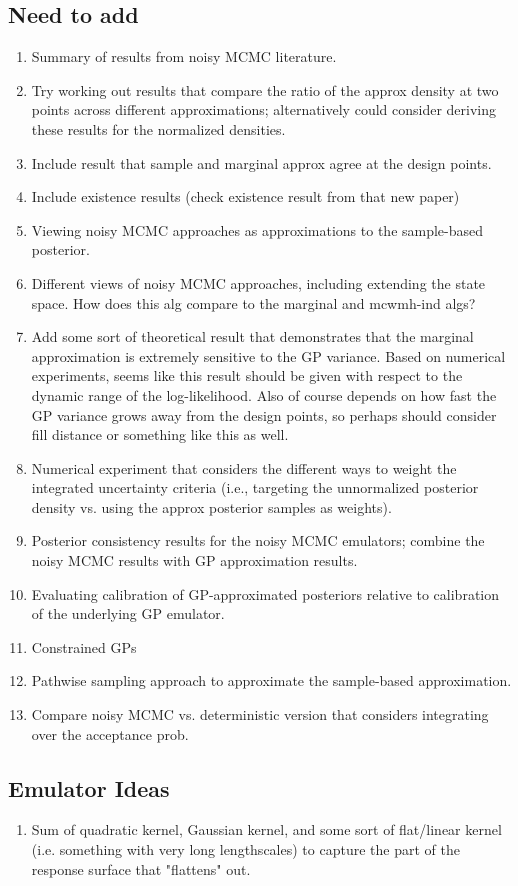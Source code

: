 \documentclass[12pt]{article}
\begin{document}
\subsection{Need to add}
\begin{enumerate}
\item Summary of results from noisy MCMC literature.
\item Try working out results that compare the ratio of the approx density at two points across different approximations; 
alternatively could consider deriving these results for the normalized densities. 
\item Include result that sample and marginal approx agree at the design points.
\item Include existence results (check existence result from that new paper)
\item Viewing noisy MCMC approaches as approximations to the sample-based posterior.
\item Different views of noisy MCMC approaches, including extending the state space. How does this alg compare to the 
marginal and mcwmh-ind algs?
\item Add some sort of theoretical result that demonstrates that the marginal approximation is extremely sensitive to the GP 
variance. Based on numerical experiments, seems like this result should be given with respect to the dynamic range of the 
log-likelihood. Also of course depends on how fast the GP variance grows away from the design points, so perhaps should 
consider fill distance or something like this as well.
\item Numerical experiment that considers the different ways to weight the integrated uncertainty criteria (i.e., targeting 
the unnormalized posterior density vs. using the approx posterior samples as weights).
\item Posterior consistency results for the noisy MCMC emulators; combine the noisy MCMC results with GP approximation 
results.
\item Evaluating calibration of GP-approximated posteriors relative to calibration of the underlying GP emulator.
\item Constrained GPs
\item Pathwise sampling approach to approximate the sample-based approximation.
\item Compare noisy MCMC vs. deterministic version that considers integrating over the acceptance prob. 
\end{enumerate}

\subsection{Emulator Ideas}
\begin{enumerate}
\item Sum of quadratic kernel, Gaussian kernel, and some sort of flat/linear kernel (i.e. something with very long lengthscales) to capture the 
part of the response surface that "flattens" out. 
\end{enumerate}
\end{document}
